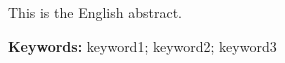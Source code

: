 \begin{abstractEN}
This is the English abstract.

\vspace{1cm}
\noindent
\textbf{Keywords:} keyword1; keyword2; keyword3
\end{abstractEN}

\newpage

